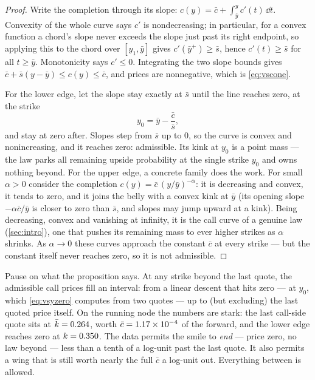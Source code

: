 \begin{proof}
Write the completion through its slope: $c(y)=\bar c+\int_{\bar
y}^{y}c'(t)\,\dd t$.  Convexity of the whole curve says $c'$ is
nondecreasing; in particular, for a convex function a chord's slope
never exceeds the slope just past its right endpoint, so applying
this to the chord over $[y_1,\bar y]$ gives $c'(\bar y^{+})\ge\bar
s$, hence $c'(t)\ge\bar s$ for all $t\ge\bar y$.  Monotonicity says
$c'\le0$.  Integrating the two slope bounds gives
$\bar c+\bar s(y-\bar y)\le c(y)\le\bar c$, and prices are
nonnegative, which is \eqref{eq:vscone}.

For the lower edge, let the slope stay exactly at $\bar s$ until the
line reaches zero, at the strike
\begin{equation}
y_0=\bar y-\frac{\bar c}{\bar s},
\label{eq:vsyzero}
\end{equation}
and stay at zero after.  Slopes step from $\bar s$ up to $0$, so the
curve is convex and nonincreasing, and it reaches zero: admissible.
Its kink at $y_0$ is a point mass --- the law parks all remaining
upside probability at the single strike $y_0$ and owns nothing
beyond.  For the upper edge, a concrete family does the work.  For
small $\alpha>0$ consider the completion
$c(y)=\bar c\,(y/\bar y)^{-\alpha}$: it is decreasing and convex, it
tends to zero, and it joins the belly with a convex kink at $\bar y$
(its opening slope $-\alpha\bar c/\bar y$ is closer to zero than
$\bar s$, and slopes may jump upward at a kink).  Being decreasing,
convex and vanishing at infinity, it is the call curve of a genuine
law (\cref{sec:intro}), one that pushes its remaining mass to ever
higher strikes as $\alpha$ shrinks.  As $\alpha\to0$ these curves
approach the constant $\bar c$ at every strike --- but the constant
itself never reaches zero, so it is not admissible.
\end{proof}

Pause on what the proposition says.  At any strike beyond the last
quote, the admissible call prices fill an interval: from a linear
descent that hits zero --- at $y_0$, which \eqref{eq:vsyzero}
computes from two quotes --- up to (but excluding) the last quoted
price itself.  On the running node the numbers are stark: the last
call-side quote sits at $\bar k=0.264$, worth
$\bar c=1.17\times10^{-4}$ of the forward, and the lower edge reaches
zero at $k=0.350$.  The data permits the smile to
\emph{end} --- price zero, no law beyond --- less than a tenth of a
log-unit past the last quote.  It also permits a wing that is still
worth nearly the full $\bar c$ a log-unit out.  Everything between is
allowed.

